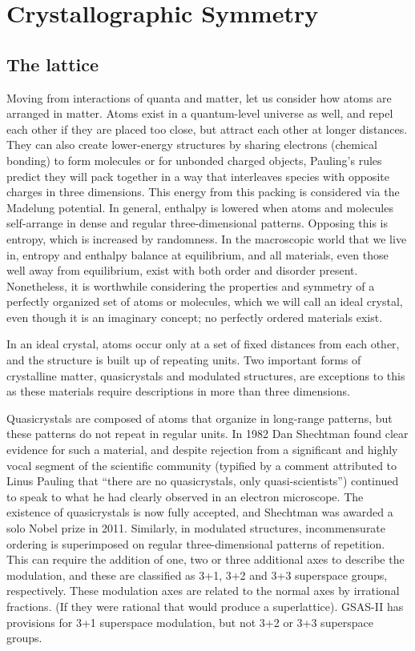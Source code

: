 \chapter{Crystallographic Symmetry}

\section{The lattice}

Moving from interactions of quanta and matter, let us consider how atoms are arranged in matter. Atoms exist in a quantum-level universe as well, and repel each other if they are placed too close, but attract each other at longer distances. They can also create lower-energy structures by sharing electrons (chemical bonding) to form molecules or for unbonded charged objects, Pauling's rules predict they will pack together in a way that interleaves species with opposite charges in three dimensions. This energy from this packing is considered via the Madelung potential. 
In general, enthalpy is lowered when atoms and molecules self-arrange in dense and regular three-dimensional patterns. Opposing this is entropy, which is increased by randomness. 
In the macroscopic world that we live in, entropy and enthalpy balance at equilibrium, and all materials, even those well away from equilibrium, exist with both order and disorder present. 
Nonetheless, it is worthwhile considering the properties and symmetry of a perfectly organized set of atoms or molecules, which we will call an ideal crystal, even though it is an imaginary concept; no perfectly ordered materials exist. 

In an ideal crystal, atoms occur only at a set of fixed distances from each other, and the structure is built up of repeating units. 
Two important forms of crystalline matter, quasicrystals and modulated structures, are exceptions to this as these materials require descriptions in more than three dimensions. 

Quasicrystals are composed of atoms that organize in long-range patterns, but these patterns do not repeat in regular units. 
In 1982 Dan Shechtman found clear evidence for such a material, and despite rejection from a significant and highly vocal segment of the scientific community (typified by a comment attributed to Linus Pauling that ``there are no quasicrystals, only quasi-scientists'') continued to speak to what he had clearly observed in an electron microscope. 
The existence of quasicrystals is now fully accepted, and Shechtman was awarded a solo Nobel prize in 2011. 
Similarly, in modulated structures, incommensurate ordering is superimposed on regular three-dimensional patterns of repetition. This can require the addition of one, two or three additional axes to describe the modulation, and these are classified as 3+1, 3+2 and 3+3 superspace groups, respectively. These modulation axes are related to the normal axes by irrational fractions. (If they were rational that would produce a superlattice). GSAS-II has provisions for 3+1 superspace modulation, but not 3+2 or 3+3 superspace groups. 


